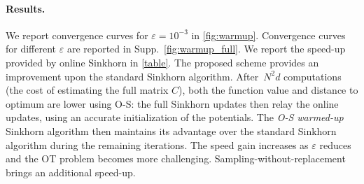 \paragraph{Results.} We report convergence curves for $\varepsilon =
10^{-3}$ in \autoref{fig:warmup}. Convergence curves for different
$\varepsilon$ are reported in Supp.~\autoref{fig:warmup_full}. We report the speed-up
provided by online Sinkhorn in \autoref{table}. The proposed scheme provides an
improvement upon the standard Sinkhorn algorithm. After $N^2 d$ computations
(the cost of estimating the full matrix $C$), both the function value and
distance to optimum are lower using O-S: the full Sinkhorn updates then
relay the online updates, using an accurate initialization of the potentials. The
\textit{O-S warmed-up} Sinkhorn algorithm then maintains its advantage over the
standard Sinkhorn algorithm during the remaining iterations. The speed gain increases
as $\varepsilon$ reduces and the OT problem becomes more challenging. Sampling-without-replacement brings an additional speed-up.
